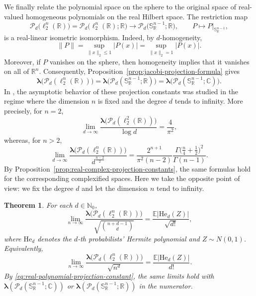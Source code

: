 \documentclass[11pt,showkeys]{amsart}
\newtheorem{theorem}{Theorem}[section]
\begin{document}
We finally relate the polynomial space on the sphere to the original space of real-valued
homogeneous polynomials on the real Hilbert space. The restriction map
\[
\mathcal P_d\bigl(\ell_2^n(\mathbb R)\bigr)
=
\mathcal P_d\bigl(\ell_2^n(\mathbb R);\mathbb R\bigr)
\longrightarrow
\mathcal P_d\bigl(\mathbb S_{\mathbb R}^{n-1};\mathbb R\bigr),
\qquad
P\longmapsto P\big|_{\mathbb S_{\mathbb R}^{n-1}},
\]
is a real-linear isometric isomorphism. Indeed, by $d$-homogeneity,
\[
\|P\|
=
\sup_{\|x\|_2\leq1}|P(x)|
=
\sup_{\|x\|_2=1}|P(x)|.
\]
Moreover, if $P$ vanishes on the sphere, then homogeneity implies that it
vanishes on all of $\mathbb R^n$. Consequently, Proposition~\ref{prop:jacobi-projection-formula}
gives
\begin{equation}
\label{eq:real-polynomial-projection-constant}
\boldsymbol \lambda\bigl(\mathcal P_d(\ell_2^n(\mathbb R))\bigr)
=
\boldsymbol \lambda\bigl(\mathcal P_d(\mathbb S_{\mathbb R}^{n-1};\mathbb R)\bigr)
=
\boldsymbol \lambda\bigl(\mathcal P_d(\mathbb S_{\mathbb R}^{n-1};\mathbb C)\bigr).
\end{equation}
In \cite[Proposition~4.5 and Corollary~4.7]{defant2026minimal}, the asymptotic behavior
of these projection constants was studied in the regime where the dimension
$n$ is fixed and the degree $d$ tends to infinity. More precisely, for
$n=2$,
\[
\lim_{d\to\infty}
\frac{
\boldsymbol \lambda\bigl(\mathcal P_d(\ell_2^2(\mathbb R))\bigr)}
{\log d}
=
\frac{4}{\pi^2},
\]
whereas, for $n>2$,
\[
\lim_{d\to\infty}
\frac{
\boldsymbol \lambda\bigl(\mathcal P_d(\ell_2^n(\mathbb R))\bigr)}
{d^{\frac{n-2}{2}}}
=
\frac{2^{n+1}}{\pi^2(n-2)}
\frac{
\Gamma\bigl(\frac n4+\frac12\bigr)^2}
{\Gamma(n-1)}.
\]
By Proposition~\ref{prop:real-complex-projection-constants}, the same
formulas hold for the corresponding complexified spaces.
Here we take the opposite point of view: we fix the degree $d$ and let the
dimension $n$ tend to infinity.

\begin{theorem}
\label{thm:high-dimensional-real-polynomials}
For each $d\in\mathbb N_0$,
\[
\lim_{n\to\infty}
\frac{
\boldsymbol \lambda\bigl(\mathcal P_d(\ell_2^n(\mathbb R))\bigr)}
{\sqrt{\binom{n+d-1}{d}}}
=
\frac{\mathbb E|\mathrm{He}_d(Z)|}{\sqrt{d!}},
\]
where $\mathrm{He}_d$ denotes the $d$-th probabilists' Hermite polynomial and
$Z\sim N(0,1)$. Equivalently,
\[
\lim_{n\to\infty}
\frac{
\boldsymbol \lambda\bigl(\mathcal P_d(\ell_2^n(\mathbb R))\bigr)}
{\sqrt{n^d}}
=
\frac{\mathbb E|\mathrm{He}_d(Z)|}{d!}.
\]
By \eqref{eq:real-polynomial-projection-constant}, the same limits hold with
$\boldsymbol \lambda(\mathcal P_d(\mathbb S_{\mathbb R}^{n-1};\mathbb C))$ or
$\boldsymbol \lambda(\mathcal P_d(\mathbb S_{\mathbb R}^{n-1};\mathbb R))$ in the
numerator.
\end{theorem}
\end{document}
